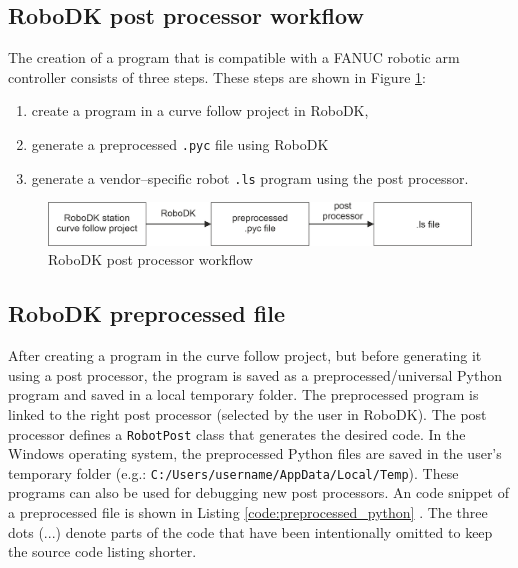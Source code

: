 \subsection{RoboDK post processor workflow}

The creation of a program that is compatible with a FANUC robotic arm controller consists of three steps. These steps are shown in Figure \ref{workflow}:

\begin{enumerate}
  \item create a program in a curve follow project in RoboDK,   
  \item generate a preprocessed \texttt{.pyc} file using RoboDK
  \item generate a vendor--specific robot \texttt{.ls} program using the post processor.
\end{enumerate}


\begin{figure}[h]
    \centering
    \includegraphics[width=0.9\linewidth]{img/workflow.jpg}
    \caption{RoboDK post processor workflow}
    \label{workflow}
\end{figure}


\subsection{RoboDK preprocessed file}

After creating a program in the curve follow project, but before generating it using a post processor, the program is saved as a preprocessed/universal Python program and saved in a local temporary folder. The preprocessed program is linked to the right post processor (selected by the user in RoboDK). The post processor defines a \texttt{RobotPost} class that generates the desired code. In the Windows operating system, the preprocessed Python files are saved in the user's temporary folder (e.g.: \texttt{C:/Users/username/AppData/Local/Temp}). These programs can also be used for debugging new post processors. An code snippet of a preprocessed file is shown in Listing \ref{code:preprocessed_python} \cite{preprocessed}. The three dots (...) denote parts of the code that have been intentionally omitted to keep the source code listing shorter. 


